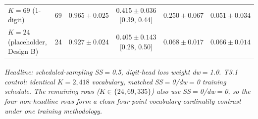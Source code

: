 \begin{table}[ht]
{\begin{tabular}{l c c c c c}
$K\!=\!69$ (1-digit)               &    69 & $0.965 \pm 0.025$ & $0.415 \pm 0.036$ \tiny{[0.39, 0.44]} & $0.250 \pm 0.067$ & $0.051 \pm 0.034$ \\
$K\!=\!24$ (placeholder, Design B) &    24 & $0.927 \pm 0.024$ & $0.405 \pm 0.143$ \tiny{[0.28, 0.50]} & $0.068 \pm 0.017$ & $0.066 \pm 0.014$ \\
\bottomrule
\end{tabular}}
\par\smallskip
\footnotesize\textit{\textsuperscript{\dag}Headline: scheduled-sampling
SS$=$0.5, digit-head loss weight dw$=$1.0.
\textsuperscript{\ddag}T3.1 control: identical $K\!=\!2{,}418$ vocabulary,
matched SS$=$0/dw$=$0 training schedule. The remaining rows
($K\!\in\!\{24, 69, 335\}$) also use SS$=$0/dw$=$0, so the four
non-headline rows form a clean four-point vocabulary-cardinality
contrast under one training methodology.}
\end{table}
